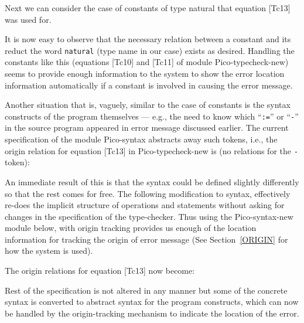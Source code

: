 Next we can consider the case of constants of type {natural}
that equation [Tc13] was used for. 


\centerline{\box\graph}

\smallskip

It is now easy to observe
that the necessary relation between a constant %
and its reduct the word {\tt natural} 
(type name in our case) exists as desired.
Handling the constants like this (equations [Tc10] and [Tc11]
of module Pico-typecheck-new) seems to
provide enough information to the system to show
the error location information automatically if a constant is involved 
in causing the error message. 

Another situation that is, vaguely, similar to the case of 
constants is the syntax constructs of the program themselves ---
e.g., the need to know which ``{\tt :=}'' or ``{\tt -}''
in the source program appeared in error message discussed earlier.
The current specification of the module Pico-syntax
abstracts away such tokens, i.e., the origin relation
for equation [Tc13] in Pico-typecheck-new is (no
relations for the {\tt -} token):


\centerline{\box\graph}

\smallskip

An immediate result of this is that the syntax could be
defined slightly differently so that the rest comes for free.
The following modification to syntax, effectively re-does
the implicit structure of operations and statements without
asking for changes in the specification of the type-checker.
Thus using the Pico-syntax-new module below, with origin
tracking provides us enough of the location information for 
tracking the origin of 
error message (See Section~\ref{ORIGIN} for how the system is used).

\newpage




\newpage
The origin relations for equation [Tc13] now become:


\centerline{\box\graph}

\smallskip

Rest of the  specification is not altered in any manner but
some of the concrete syntax is converted to abstract
syntax for the program constructs, which can now be
handled by the origin-tracking mechanism to indicate
the location of the error.

